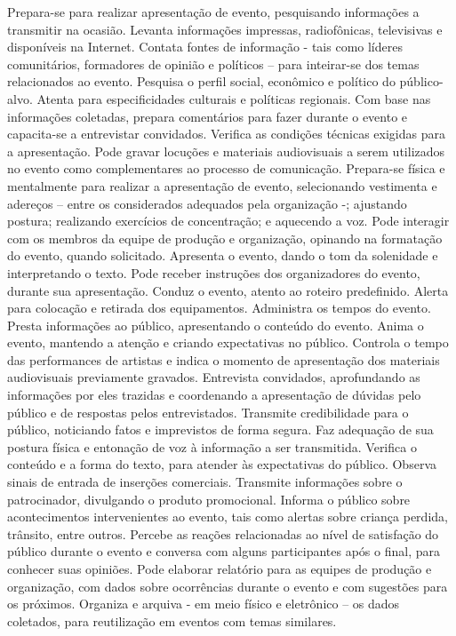 \documentclass[
]{article}
\begin{document}
Prepara-se para realizar apresentação de evento, pesquisando informações
a transmitir na ocasião. Levanta informações impressas, radiofônicas,
televisivas e disponíveis na Internet. Contata fontes de informação -
tais como líderes comunitários, formadores de opinião e políticos --
para inteirar-se dos temas relacionados ao evento. Pesquisa o perfil
social, econômico e político do público-alvo. Atenta para
especificidades culturais e políticas regionais. Com base nas
informações coletadas, prepara comentários para fazer durante o evento e
capacita-se a entrevistar convidados. Verifica as condições técnicas
exigidas para a apresentação. Pode gravar locuções e materiais
audiovisuais a serem utilizados no evento como complementares ao
processo de comunicação. Prepara-se física e mentalmente para realizar a
apresentação de evento, selecionando vestimenta e adereços -- entre os
considerados adequados pela organização -; ajustando postura; realizando
exercícios de concentração; e aquecendo a voz. Pode interagir com os
membros da equipe de produção e organização, opinando na formatação do
evento, quando solicitado. Apresenta o evento, dando o tom da solenidade
e interpretando o texto. Pode receber instruções dos organizadores do
evento, durante sua apresentação. Conduz o evento, atento ao roteiro
predefinido. Alerta para colocação e retirada dos equipamentos.
Administra os tempos do evento. Presta informações ao público,
apresentando o conteúdo do evento. Anima o evento, mantendo a atenção e
criando expectativas no público. Controla o tempo das performances de
artistas e indica o momento de apresentação dos materiais audiovisuais
previamente gravados. Entrevista convidados, aprofundando as informações
por eles trazidas e coordenando a apresentação de dúvidas pelo público e
de respostas pelos entrevistados. Transmite credibilidade para o
público, noticiando fatos e imprevistos de forma segura. Faz adequação
de sua postura física e entonação de voz à informação a ser transmitida.
Verifica o conteúdo e a forma do texto, para atender às expectativas do
público. Observa sinais de entrada de inserções comerciais. Transmite
informações sobre o patrocinador, divulgando o produto promocional.
Informa o público sobre acontecimentos intervenientes ao evento, tais
como alertas sobre criança perdida, trânsito, entre outros. Percebe as
reações relacionadas ao nível de satisfação do público durante o evento
e conversa com alguns participantes após o final, para conhecer suas
opiniões. Pode elaborar relatório para as equipes de produção e
organização, com dados sobre ocorrências durante o evento e com
sugestões para os próximos. Organiza e arquiva - em meio físico e
eletrônico -- os dados coletados, para reutilização em eventos com temas
similares.
\end{document}
